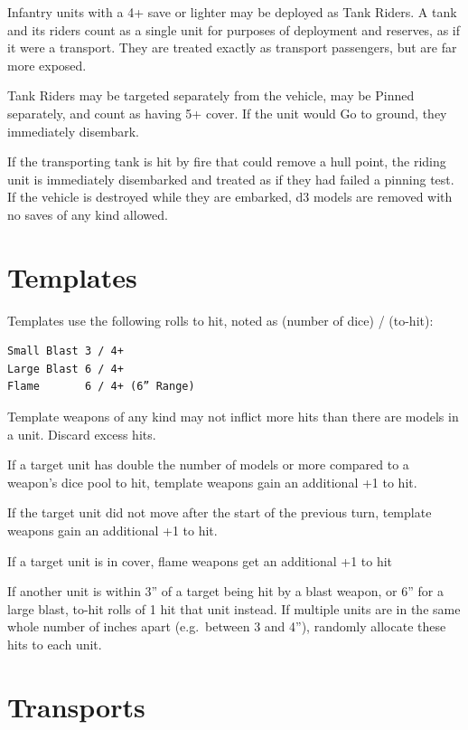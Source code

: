 \documentclass[letterpaper,twocolumn,oneside,titlepage]{book}
\begin{document}
Infantry units with a 4+ save or lighter may be deployed as Tank Riders.
A tank and its riders count as a single unit for purposes of deployment
and reserves, as if it were a transport. They are treated exactly as
transport passengers, but are far more exposed.

Tank Riders may be targeted separately from the vehicle, may be Pinned
separately, and count as having 5+ cover. If the unit would Go to
ground, they immediately disembark.

If the transporting tank is hit by fire that could remove a hull point,
the riding unit is immediately disembarked and treated as if they had
failed a pinning test. If the vehicle is destroyed while they are
embarked, d3 models are removed with no saves of any kind allowed.

\section{\texorpdfstring{\textbf{Templates}}{Templates}}\label{templates}

Templates use the following rolls to hit, noted as (number of dice) /
(to-hit):

\begin{verbatim}
Small Blast 3 / 4+  
Large Blast 6 / 4+  
Flame       6 / 4+ (6” Range)
\end{verbatim}

Template weapons of any kind may not inflict more hits than there are
models in a unit. Discard excess hits.

If a target unit has double the number of models or more compared to a
weapon's dice pool to hit, template weapons gain an additional +1 to
hit.

If the target unit did not move after the start of the previous turn,
template weapons gain an additional +1 to hit.

If a target unit is in cover, flame weapons get an additional +1 to hit

If another unit is within 3'' of a target being hit by a blast weapon,
or 6'' for a large blast, to-hit rolls of 1 hit that unit instead. If
multiple units are in the same whole number of inches apart
(e.g.~between 3 and 4''), randomly allocate these hits to each unit.

\section{\texorpdfstring{\textbf{Transports}}{Transports}}\label{transports}
\end{document}
